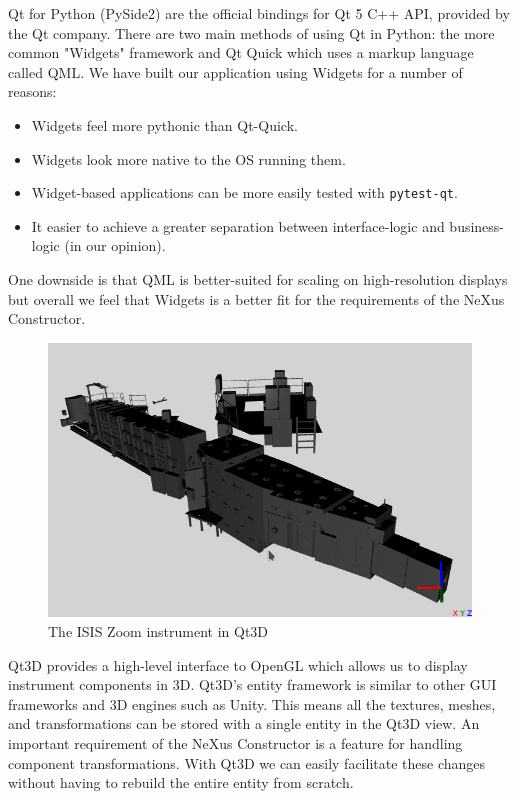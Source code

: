 Qt for Python (PySide2) are the official bindings for Qt 5 C++ API, provided by the Qt company. There are two main methods of using Qt in Python: the more common "Widgets" framework and Qt Quick which uses a markup language called QML. We have built our application using Widgets for a number of reasons: 
\begin{itemize}
\item Widgets feel more pythonic than Qt-Quick.
\item Widgets look more native to the OS running them.
\item Widget-based applications can be more easily tested with \texttt{pytest-qt}.
\item It easier to achieve a greater separation between interface-logic and business-logic (in our opinion).
\end{itemize}

One downside is that QML is better-suited for scaling on high-resolution displays but overall we feel that Widgets is a better fit for the requirements of the NeXus Constructor.

\begin{figure}
\begin{center}
\includegraphics[width=\linewidth]{zoom.jpg}
\end{center}
\caption{The ISIS Zoom instrument in Qt3D}
\end{figure}

Qt3D provides a high-level interface to OpenGL which allows us to display instrument components in 3D. Qt3D's entity framework is similar to other GUI frameworks and 3D engines such as Unity. This means all the textures, meshes, and transformations can be stored with a single entity in the Qt3D view. An important requirement of the NeXus Constructor is a feature for handling component transformations. With Qt3D we can easily facilitate these changes without having to rebuild the entire entity from scratch.

\vspace{1.8cm}
